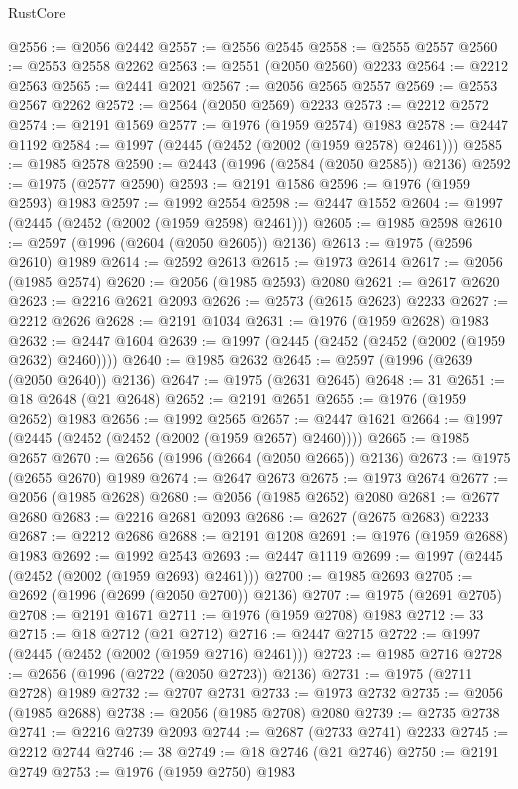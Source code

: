 \begin{lexlean}{RustCore}
\begin{coremodule}
@2556 := @2056 @2442
@2557 := @2556 @2545
@2558 := @2555 @2557
@2560 := @2553 @2558 @2262
@2563 := @2551 (@2050 @2560) @2233
@2564 := @2212 @2563
@2565 := @2441 @2021
@2567 := @2056 @2565 @2557
@2569 := @2553 @2567 @2262
@2572 := @2564 (@2050 @2569) @2233
@2573 := @2212 @2572
@2574 := @2191 @1569
@2577 := @1976 (@1959 @2574) @1983
@2578 := @2447 @1192
@2584 := @1997 (@2445 (@2452 (@2002 (@1959 @2578) @2461)))
@2585 := @1985 @2578
@2590 := @2443 (@1996 (@2584 (@2050 @2585)) @2136)
@2592 := @1975 (@2577 @2590)
@2593 := @2191 @1586
@2596 := @1976 (@1959 @2593) @1983
@2597 := @1992 @2554
@2598 := @2447 @1552
@2604 := @1997 (@2445 (@2452 (@2002 (@1959 @2598) @2461)))
@2605 := @1985 @2598
@2610 := @2597 (@1996 (@2604 (@2050 @2605)) @2136)
@2613 := @1975 (@2596 @2610) @1989
@2614 := @2592 @2613
@2615 := @1973 @2614
@2617 := @2056 (@1985 @2574)
@2620 := @2056 (@1985 @2593) @2080
@2621 := @2617 @2620
@2623 := @2216 @2621 @2093
@2626 := @2573 (@2615 @2623) @2233
@2627 := @2212 @2626
@2628 := @2191 @1034
@2631 := @1976 (@1959 @2628) @1983
@2632 := @2447 @1604
@2639 := @1997 (@2445 (@2452 (@2452 (@2002 (@1959 @2632) @2460))))
@2640 := @1985 @2632
@2645 := @2597 (@1996 (@2639 (@2050 @2640)) @2136)
@2647 := @1975 (@2631 @2645)
@2648 := 31
@2651 := @18 @2648 (@21 @2648)
@2652 := @2191 @2651
@2655 := @1976 (@1959 @2652) @1983
@2656 := @1992 @2565
@2657 := @2447 @1621
@2664 := @1997 (@2445 (@2452 (@2452 (@2002 (@1959 @2657) @2460))))
@2665 := @1985 @2657
@2670 := @2656 (@1996 (@2664 (@2050 @2665)) @2136)
@2673 := @1975 (@2655 @2670) @1989
@2674 := @2647 @2673
@2675 := @1973 @2674
@2677 := @2056 (@1985 @2628)
@2680 := @2056 (@1985 @2652) @2080
@2681 := @2677 @2680
@2683 := @2216 @2681 @2093
@2686 := @2627 (@2675 @2683) @2233
@2687 := @2212 @2686
@2688 := @2191 @1208
@2691 := @1976 (@1959 @2688) @1983
@2692 := @1992 @2543
@2693 := @2447 @1119
@2699 := @1997 (@2445 (@2452 (@2002 (@1959 @2693) @2461)))
@2700 := @1985 @2693
@2705 := @2692 (@1996 (@2699 (@2050 @2700)) @2136)
@2707 := @1975 (@2691 @2705)
@2708 := @2191 @1671
@2711 := @1976 (@1959 @2708) @1983
@2712 := 33
@2715 := @18 @2712 (@21 @2712)
@2716 := @2447 @2715
@2722 := @1997 (@2445 (@2452 (@2002 (@1959 @2716) @2461)))
@2723 := @1985 @2716
@2728 := @2656 (@1996 (@2722 (@2050 @2723)) @2136)
@2731 := @1975 (@2711 @2728) @1989
@2732 := @2707 @2731
@2733 := @1973 @2732
@2735 := @2056 (@1985 @2688)
@2738 := @2056 (@1985 @2708) @2080
@2739 := @2735 @2738
@2741 := @2216 @2739 @2093
@2744 := @2687 (@2733 @2741) @2233
@2745 := @2212 @2744
@2746 := 38
@2749 := @18 @2746 (@21 @2746)
@2750 := @2191 @2749
@2753 := @1976 (@1959 @2750) @1983

\end{coremodule}
\end{lexlean}

